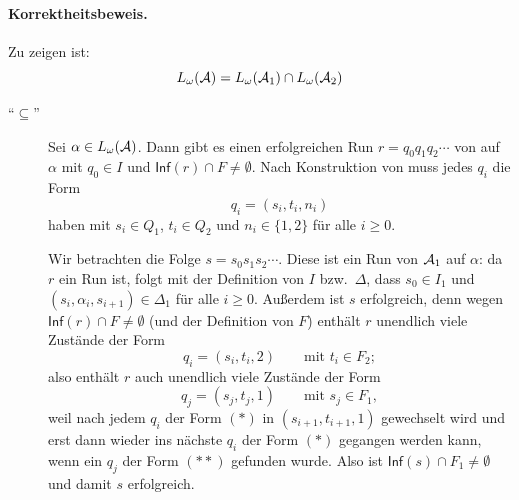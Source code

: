 \documentclass[fontsize=11pt, twoside=false, numbers=autoenddot]{scrbook}
\begin{document}
\paragraph*{Korrektheitsbeweis.}
Zu zeigen ist:
\[
  L_\omega(\mathcal{A}) = L_\omega(\mathcal{A}_1) \cap L_\omega(\mathcal{A}_2)
\]
  \begin{description}
    \item[{\boldmath"`$\subseteq$"'}]
      Sei $\alpha \in L_\omega(\mathcal{A})$.
      Dann gibt es einen erfolgreichen Run $r = q_0q_1q_2\cdots$ von \Amc auf $\alpha$
      mit $q_0 \in I$ und $\textsf{Inf}(r) \cap F \neq \emptyset$.
      Nach Konstruktion von \Amc muss jedes $q_i$ die Form
      \[
        q_i = (s_i,t_i,n_i)
      \]
      haben mit $s_i \in Q_1$, $t_i \in Q_2$ und $n_i \in \{1,2\}$ für alle $i \geq 0$.
      
      Wir betrachten die Folge $s = s_0s_1s_2\cdots$.
      Diese ist ein Run von $\mathcal{A}_1$ auf $\alpha$:
      da $r$ ein Run ist, folgt mit der Definition von $I$ bzw.\ $\Delta$, dass
      $s_0 \in I_1$ und $(s_i,\alpha_i,s_{i+1}) \in \Delta_1$ für alle $i \geq 0$.
      Außerdem ist $s$ erfolgreich, denn wegen $\textsf{Inf}(r) \cap F \neq \emptyset$
      (und der Definition von $F$)
      enthält $r$ unendlich viele Zustände der Form
      \[
        \tag{$*$}
        q_i = (s_i,t_i,2) \qquad \text{mit~} t_i \in F_2;
      \]
      also enthält $r$ auch unendlich viele Zustände der Form
      \[
        \tag{$**$}
        q_j = (s_j,t_j,1) \qquad \text{mit~} s_j \in F_1,
      \]
      weil nach jedem $q_i$ der Form $(*)$ in $(s_{i+1},t_{i+1},1)$ gewechselt wird
      und erst dann wieder ins nächste $q_i$ der Form $(*)$ gegangen werden kann,
      wenn ein $q_j$ der Form $(**)$ gefunden wurde.
      Also ist $\textsf{Inf}(s) \cap F_1 \neq \emptyset$ und damit $s$ erfolgreich.
      

\end{description}
\end{document}
